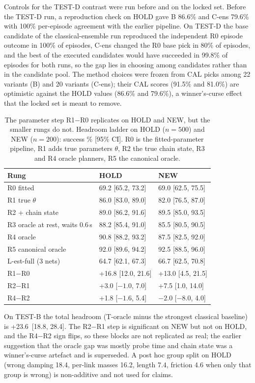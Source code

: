 Controls for the TEST-D contrast were run before and on the locked set. Before the TEST-D run, a reproduction check on HOLD gave B 86.6\% and C-ens 79.6\% with 100\% per-episode agreement with the earlier pipeline. On TEST-D the base candidate of the classical-ensemble run reproduced the independent R0 episode outcome in 100\% of episodes, C-ens changed the R0 base pick in 80\% of episodes, and the best of the executed candidates would have succeeded in 99.8\% of episodes for both runs, so the gap lies in choosing among candidates rather than in the candidate pool. The method choices were frozen from CAL picks among 22 variants (B) and 20 variants (C-ens); their CAL scores (91.5\% and 81.0\%) are optimistic against the HOLD values (86.6\% and 79.6\%), a winner's-curse effect that the locked set is meant to remove.

\begin{table}[htbp]
\centering
\caption{The parameter step R1$-$R0 replicates on HOLD and NEW, but the smaller rungs do not. Headroom ladder on HOLD ($n{=}500$) and NEW ($n{=}200$): success \% [95\% CI]. R0 is the fitted-parameter pipeline, R1 adds true parameters $\theta$, R2 the true chain state, R3 and R4 oracle planners, R5 the canonical oracle.}
\label{tab:replication}
\begin{tabular}{@{}lll@{}}
\toprule
Rung & HOLD & NEW \\ \midrule
R0 fitted & 69.2 [65.2, 73.2] & 69.0 [62.5, 75.5] \\
R1 true $\theta$ & 86.0 [83.0, 89.0] & 82.0 [76.5, 87.0] \\
R2 + chain state & 89.0 [86.2, 91.6] & 89.5 [85.0, 93.5] \\
R3 oracle at rest, waits 0.6\,s & 88.2 [85.4, 91.0] & 85.5 [80.5, 90.5] \\
R4 oracle & 90.8 [88.2, 93.2] & 87.5 [82.5, 92.0] \\
R5 canonical oracle & 92.0 [89.6, 94.2] & 92.5 [88.5, 96.0] \\
L-est-full (3 nets) & 64.7 [62.1, 67.3] & 66.7 [62.5, 70.8] \\
R1$-$R0 & +16.8 [12.0, 21.6] & +13.0 [4.5, 21.5] \\
R2$-$R1 & +3.0 [$-1.0$, 7.0] & +7.5 [1.0, 14.0] \\
R4$-$R2 & +1.8 [$-1.6$, 5.4] & $-2.0$ [$-8.0$, 4.0] \\
\bottomrule
\end{tabular}
\end{table}

On TEST-B the total headroom (T-oracle minus the strongest classical baseline) is +23.6\pp\ [18.8, 28.4]. The R2$-$R1 step is significant on NEW but not on HOLD, and the R4$-$R2 sign flips, so these blocks are not replicated as real; the earlier suggestion that the oracle gap was mostly probe time and chain state was a winner's-curse artefact and is superseded. A post hoc group split on HOLD (wrong damping 18.4\pp, per-link masses 16.2, length 7.4, friction 4.6 when only that group is wrong) is non-additive and not used for claims.

